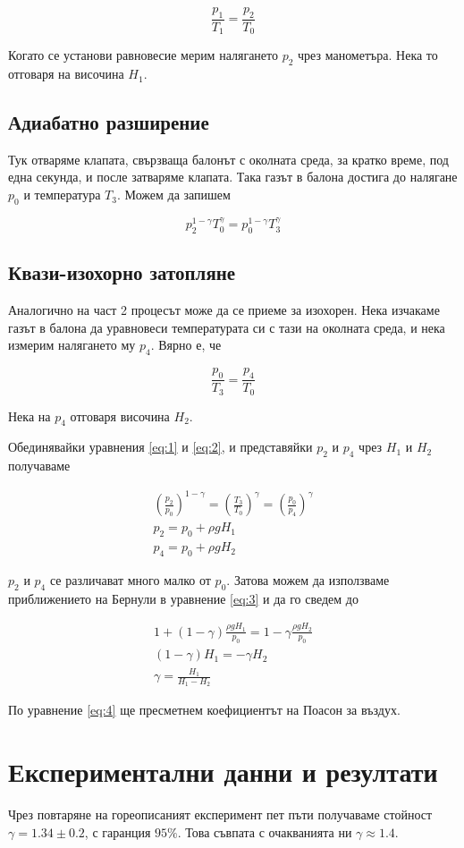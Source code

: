 \documentclass[%
 reprint,
 amsmath,amssymb,
 aps,
]{revtex4-2}
\begin{document}
\begin{equation*}
    \frac{p_1}{T_1} = \frac{p_2}{T_0}
\end{equation*}

Когато се установи равновесие мерим налягането $p_2$ чрез манометъра. Нека то отговаря на височина $H_1$. 

\subsection{Адиабатно разширение}
Тук отваряме клапата, свързваща балонът с околната среда, за кратко време, под една секунда, и после затваряме клапата. Така газът в балона достига до налягане $p_0$ и температура $T_3$. Можем да запишем

\begin{equation*}
    p_2^{1-\gamma} T_0^{\gamma} = p_0^{1 - \gamma} T_3^{\gamma} \label{eq:1} \tag{1}
\end{equation*}

\subsection{Квази-изохорно затопляне}
Аналогично на част 2 процесът може да се приеме за изохорен. Нека изчакаме газът в балона да уравновеси температурата си с тази на околната среда, и нека измерим налягането му $p_4$. Вярно е, че

\begin{equation*}
    \frac{p_0}{T_3} = \frac{p_4}{T_0} \label{eq:2} \tag{2}
\end{equation*}

Нека на $p_4$ отговаря височина $H_2$. 

Обединявайки уравнения \eqref{eq:1} и \eqref{eq:2}, и представяйки $p_2$ и $p_4$ чрез $H_1$ и $H_2$ получаваме

\begin{gather*}
    (\frac{p_2}{p_0})^{1 - \gamma} = (\frac{T_3}{T_0})^{\gamma} = (\frac{p_0}{p_4})^{\gamma} \label{eq:3} \tag{3}\\
    p_2 = p_0 + \rho g H_1 \\
    p_4 = p_0 + \rho g H_2
\end{gather*}

$p_2$ и $p_4$ се различават много малко от $p_0$. Затова можем да използваме приближението на Бернули в уравнение \eqref{eq:3} и да го сведем до 

\begin{gather*}
    1 + (1 - \gamma) \frac{\rho g H_1}{p_0} = 1 - \gamma \frac{\rho g H_2}{p_0} \\
    (1 - \gamma) H_1 = -\gamma H_2 \\
    \gamma = \frac{H_1}{H_1 - H_2} \label{eq:4} \tag{4}
\end{gather*}

По уравнение \eqref{eq:4} ще пресметнем коефициентът на Поасон за въздух. 
\section{Експериментални данни и резултати}

Чрез повтаряне на гореописаният експеримент пет пъти получаваме стойност $\gamma = 1.34 \pm 0.2$, с гаранция $95 \%$. Това съвпата с очакванията ни $\gamma \approx 1.4$.
\end{document}
